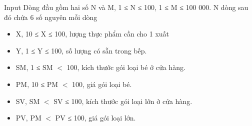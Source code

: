 Input
Dòng đầu gồm hai số N và M, 1 ≤ N ≤ 100, 1 ≤ M ≤ 100 000. N dòng sau đó chứa 6 số nguyên mỗi dòng
\begin{itemize}
	\item X, 10 ≤ X ≤ 100, lượng thực phẩm cần cho 1 xuất
	\item Y, 1 ≤ Y ≤ 100, số lượng có sẵn trong bếp.
	\item SM, 1 ≤ SM $<$ 100, kích thước gói loại bé ở cửa hàng.
	\item PM, 10 ≤ PM $<$ 100, giá gói loại bé.
	\item SV, SM $<$ SV ≤ 100, kích thước gói loại lớn ở cửa hàng.
	\item PV, PM $<$ PV ≤ 100, giá gói loại lớn.
\end{itemize}